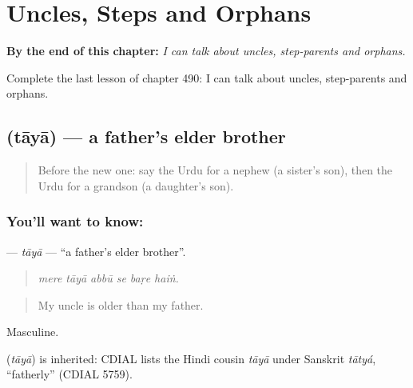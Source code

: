 
\chapter{Uncles, Steps and Orphans}
\label{ch:ur-uncles-steps-and-orphans}

\begin{chapteropening}
\textbf{By the end of this chapter:} \emph{I can talk about uncles, step-parents and orphans.}

Complete the last lesson of chapter 490: I can talk about uncles, step-parents and orphans.
\end{chapteropening}

\section[\texorpdfstring{\ur{تایا} (tāyā)}{تایا (tāyā)}]{ (tāyā) — a father's elder brother}

\label{lesson:UR-C490-taya}



\begin{quote}
Before the new one: say the Urdu for a nephew (a sister's son), then the Urdu for a grandson (a daughter's son).
\end{quote}

\subsection*{You'll want to know: }
\textbf{} — \emph{tāyā} — \textquotedblleft{}a father's elder brother\textquotedblright{}.

\begin{quote}
     
\end{quote}

\begin{quote}
\emph{mere tāyā abbū se baṛe haiṅ.}
\end{quote}

\begin{quote}
My uncle is older than my father.
\end{quote}

Masculine.

\begin{cousinweb}
\textbf{} (\emph{tāyā}) is inherited: CDIAL lists the Hindi cousin \emph{tāyā} under Sanskrit \emph{tātyá}, \textquotedblleft{}fatherly\textquotedblright{} (CDIAL 5759).
\end{cousinweb}


